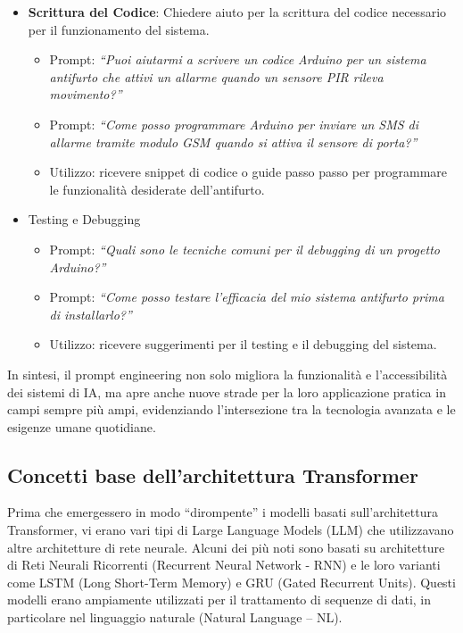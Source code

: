 \begin{itemize}
\begin{itemize}
                    \item \textbf{Scrittura del Codice}: Chiedere aiuto per la scrittura del codice necessario per il funzionamento del sistema.
                    \begin{itemize}
                        \item Prompt: \textit{``Puoi aiutarmi a scrivere un codice Arduino per un sistema antifurto che attivi un allarme quando un sensore PIR rileva movimento?''}
                        \item Prompt: \textit{``Come posso programmare Arduino per inviare un SMS di allarme tramite modulo GSM quando si attiva il sensore di porta?''}
                        \item Utilizzo: ricevere snippet di codice o guide passo passo per programmare le funzionalità desiderate dell’antifurto.
                    \end{itemize}
                    
                    \item Testing e Debugging
                    \begin{itemize}
                        \item Prompt: \textit{``Quali sono le tecniche comuni per il debugging di un progetto Arduino?''}
                        \item Prompt: \textit{``Come posso testare l'efficacia del mio sistema antifurto prima di installarlo?''}
                        \item Utilizzo: ricevere suggerimenti per il testing e il debugging del sistema.
                    \end{itemize}
                \end{itemize}
            \end{itemize}

            In sintesi, il prompt engineering non solo migliora la funzionalità e l'accessibilità dei sistemi di IA, ma apre anche nuove strade per la loro applicazione pratica in campi sempre più ampi, evidenziando l'intersezione tra la tecnologia avanzata e le esigenze umane quotidiane.
            
    \subsection{Concetti base dell’architettura Transformer}
        Prima che emergessero in modo ``dirompente'' i modelli basati sull'architettura Transformer, vi erano vari tipi di Large Language Models (LLM) che utilizzavano altre architetture di rete neurale. Alcuni dei più noti sono basati su architetture di Reti Neurali Ricorrenti (Recurrent Neural Network - RNN) e le loro varianti come LSTM (Long Short-Term Memory) e GRU (Gated Recurrent Units). Questi modelli erano ampiamente utilizzati per il trattamento di sequenze di dati, in particolare nel linguaggio naturale (Natural Language – NL).

